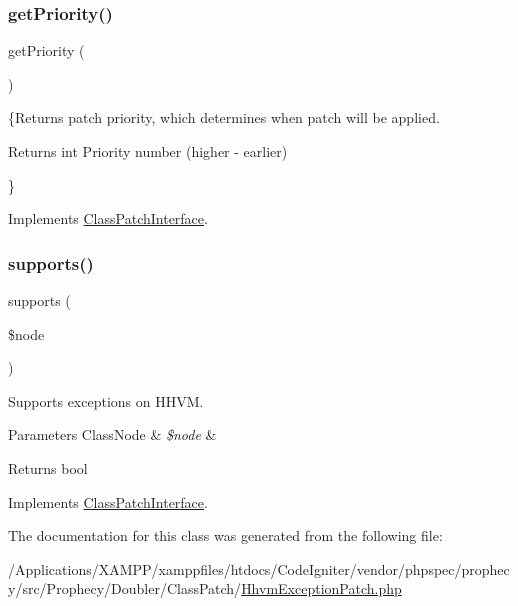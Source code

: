 \subsubsection{\texorpdfstring{get\+Priority()}{getPriority()}}
{\footnotesize\ttfamily get\+Priority (\begin{DoxyParamCaption}{ }\end{DoxyParamCaption})}

\{Returns patch priority, which determines when patch will be applied.

\begin{DoxyReturn}{Returns}
int Priority number (higher -\/ earlier)
\end{DoxyReturn}
\} 

Implements \mbox{\hyperlink{interface_prophecy_1_1_doubler_1_1_class_patch_1_1_class_patch_interface_a1e7a3c168dcd0901a0d2669c67575b55}{Class\+Patch\+Interface}}.

\mbox{\label{class_prophecy_1_1_doubler_1_1_class_patch_1_1_hhvm_exception_patch_a99b2455ac194faf79aff042c55719ac2}} 
\subsubsection{\texorpdfstring{supports()}{supports()}}
{\footnotesize\ttfamily supports (\begin{DoxyParamCaption}\item[{\mbox{\hyperlink{class_prophecy_1_1_doubler_1_1_generator_1_1_node_1_1_class_node}{Class\+Node}}}]{\$node }\end{DoxyParamCaption})}

Supports exceptions on H\+H\+VM.


\begin{DoxyParams}[1]{Parameters}
Class\+Node & {\em \$node} & \\
\hline
\end{DoxyParams}
\begin{DoxyReturn}{Returns}
bool 
\end{DoxyReturn}


Implements \mbox{\hyperlink{interface_prophecy_1_1_doubler_1_1_class_patch_1_1_class_patch_interface_a99b2455ac194faf79aff042c55719ac2}{Class\+Patch\+Interface}}.



The documentation for this class was generated from the following file\+:\begin{DoxyCompactItemize}
\item 
/\+Applications/\+X\+A\+M\+P\+P/xamppfiles/htdocs/\+Code\+Igniter/vendor/phpspec/prophecy/src/\+Prophecy/\+Doubler/\+Class\+Patch/\mbox{\hyperlink{_hhvm_exception_patch_8php}{Hhvm\+Exception\+Patch.\+php}}\end{DoxyCompactItemize}
